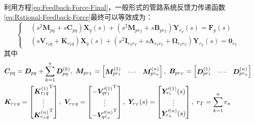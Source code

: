 利用方程\eqref{eq:Feedback-Force-Final}，一般形式的管路系统反馈力传递函数\eqref{eq:Rational-Feedback-Force}最终可以等效成为：
\begin{equation}
	\label{eq:Final-Common-Feedback-SVD-Force}
	\left\{
	\begin{aligned}
	&({s}^{2}{\boldsymbol{M}_{pq}}+s{\boldsymbol{C}_{pq}})\boldsymbol{X}_{q}(s)+({s}^{2}\boldsymbol{M}_{pr_T}+s{\boldsymbol{B}_{pr_T}})\boldsymbol{Y}_{r_T}(s)=\boldsymbol{F}_{p}(s) \\ 
	&(s\boldsymbol{V}_{r_Tq}+\boldsymbol{K}_{r_Tq})\boldsymbol{X}_{q}(s)+(s^2\boldsymbol{I}_{r_Tr_T}+s\boldsymbol{\Lambda}_{r_Tr_T} + \boldsymbol{\Omega}_{r_Tr_T})\boldsymbol{Y}_{r_T}(s)=\boldsymbol{0}_{r_T}
	\end{aligned} \right.
\end{equation}
其中
\begin{displaymath}
	\begin{aligned}
		&\boldsymbol{C}_{pq}=\boldsymbol{D}_{pq}+\sum_{k=1}^{n}{\boldsymbol{D}_{pq}^{(k)}} ,\ 
		\boldsymbol{M}_{pr_T}=\left[ \begin{matrix}
		   \boldsymbol{M}_{pr_1}^{(1)} & \cdots & \boldsymbol{M}_{pr_n}^{(n)}
		\end{matrix} \right] ,\ 
		\boldsymbol{B}_{pr_T}=\left[ \begin{matrix}
		   \boldsymbol{D}_{pr_1}^{(1)} & \cdots & \boldsymbol{D}_{pr_n}^{(n)}
		\end{matrix} \right]  \\
		&\boldsymbol{K}_{r_Tq}=\left[ \begin{matrix}
		   {\boldsymbol{K}_{r_1q}^{(1)}}^{\ut}  \\
		   \vdots   \\
		   {\boldsymbol{K}_{r_nq}^{(n)}}^{\ut}
		\end{matrix} \right], \ 
		\boldsymbol{V}_{r_Tq}=\left[ \begin{matrix}
		   -{\boldsymbol{V}_{qr_1}^{\prime(1)}}^{\ut}  \\
		   \vdots   \\
		   -{\boldsymbol{V}_{qr_n}^{\prime(n)}}^{\ut}
		\end{matrix} \right], \ 
		\boldsymbol{Y}_{r_T}(s)=\left[ \begin{matrix}
		   \boldsymbol{Y}_{r_1}^{\prime(1)}(s)  \\
		   \vdots   \\
		   \boldsymbol{Y}_{r_n}^{\prime(n)}(s)
		\end{matrix} \right],\ 
		r_T= \sum_{k=1}^n r_n\\

\end{aligned}
\end{displaymath}
